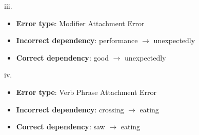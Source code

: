 \begin{parts}
{ iii.  
 \begin{itemize}
    \item[] \textbf{Error type}: Modifier Attachment Error 
    \item[] \textbf{Incorrect dependency}: performance $\rightarrow$ unexpectedly 
    \item[] \textbf{Correct dependency}: good $\rightarrow$ unexpectedly
\end{itemize}

 iv.  
 \begin{itemize}
    \item[] \textbf{Error type}: Verb Phrase Attachment Error 
    \item[] \textbf{Incorrect dependency}: crossing $\rightarrow$ eating 
    \item[] \textbf{Correct dependency}: saw $\rightarrow$ eating
\end{itemize}
}
  
\end{parts}
